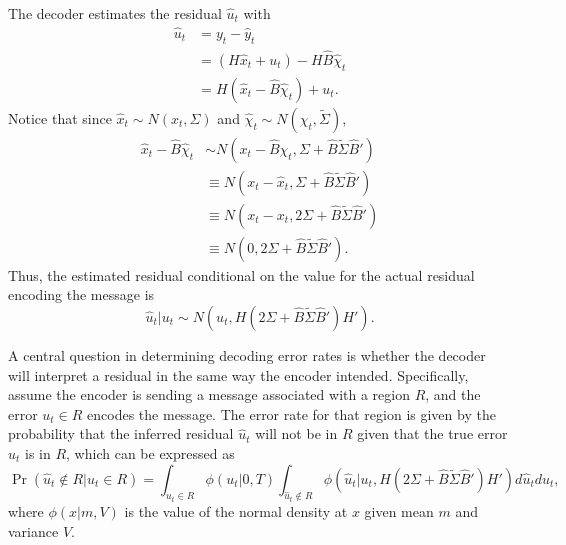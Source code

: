 \documentclass{article}
\begin{document}
The decoder estimates the residual $\hat{u}_t$ with
\begin{subequations}
	\begin{align}
	\hat{u}_t &= y_t - \hat{y}_t \\
	&= (H \hat{x}_t + u_t) - H \hat{B} \hat{\chi}_t \\
	&= H(\hat{x}_t - \hat{B} \hat{\chi}_t) + u_t.
	\end{align}
\end{subequations}
Notice that since $\hat{x}_t \sim N(x_t, \Sigma)$ and $\hat{\chi}_t \sim N(\chi_t, \tilde{\Sigma})$,
\begin{subequations}
\begin{align}
	\hat{x}_t - \hat{B} \hat{\chi}_t &\sim N(x_t - \hat{B} \chi_t, \Sigma + \hat{B} \tilde{\Sigma} \hat{B}') \\
	&\equiv N(x_t - \hat{x}_t, \Sigma + \hat{B} \tilde{\Sigma} \hat{B}') \\
	&\equiv N(x_t - x_t, 2\Sigma + \hat{B} \tilde{\Sigma} \hat{B}') \\
	&\equiv N(0, 2\Sigma + \hat{B} \tilde{\Sigma} \hat{B}').
\end{align}
\end{subequations}
Thus, the estimated residual conditional on the value for the actual residual encoding the message is
\begin{equation}
	\hat{u}_t | u_t \sim N(u_t, H (2\Sigma + \hat{B} \tilde{\Sigma} \hat{B}') H').
\end{equation}

A central question in determining decoding error rates is whether the decoder will interpret a residual in the same way the encoder intended. Specifically, assume the encoder is sending a message associated with a region $R$, and the error $u_t\in R$ encodes the message. The error rate for that region is given by the probability that the inferred residual $\hat{u}_t$ will not be in $R$ given that the true error $u_t$ is in $R$, which can be expressed as
\begin{equation}
	\Pr(\hat{u}_t \not\in R | u_t \in R) = \int_{u_t\in R} \phi(u_t | 0, T) \int_{\hat{u}_t \not\in R} \phi(\hat{u}_t | u_t, H (2\Sigma + \hat{B} \tilde{\Sigma} \hat{B}') H') d\hat{u}_t du_t,
\end{equation}
where $\phi(x | m, V)$ is the value of the normal density at $x$ given mean $m$ and variance $V$.



\end{document}
